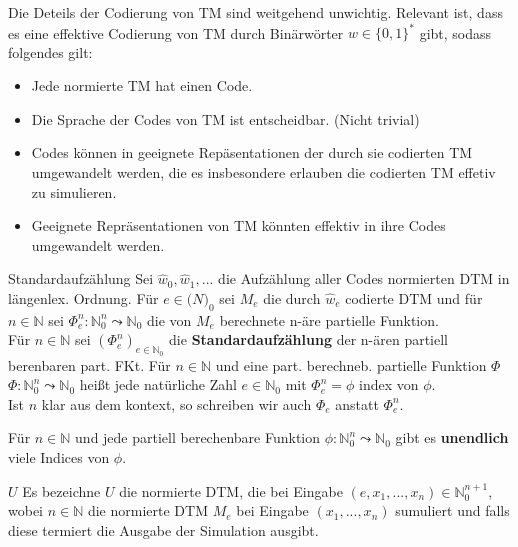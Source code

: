Die Deteils der Codierung von TM sind weitgehend unwichtig. Relevant ist, dass es eine effektive Codierung 
von TM durch Binärwörter $w \in \{0,1\}^*$ gibt, sodass folgendes gilt:
\begin{itemize}
    \item Jede normierte TM hat einen Code.
    \item Die Sprache der Codes von TM ist entscheidbar. (Nicht trivial)
    \item Codes können in geeignete Repäsentationen der durch sie codierten TM umgewandelt werden, die es 
          insbesondere erlauben die codierten TM effetiv zu simulieren.
    \item Geeignete Repräsentationen von TM könnten effektiv in ihre Codes umgewandelt werden.
\end{itemize}

\begin{defn}{Standardaufzählung}
    Sei $\hat{w}_0, \hat{w}_1,...$ die Aufzählung aller Codes normierten DTM in längenlex. Ordnung. Für $e \in \mathbb(N)_0$ sei $M_e$
    die durch $\hat{w}_e$ codierte DTM und für $n \in \mathbb{N}$ sei $\Phi_e^n : \mathbb{N}_0^n \leadsto \mathbb{N}_0$ die von $M_e$ 
    berechnete n-äre partielle Funktion.\\
    
    Für $n \in \mathbb{N}$ sei $(\Phi_e^n)_{e \in \mathbb{N}_0}$ die \textbf{Standardaufzählung} der n-ären partiell berenbaren part. FKt. 
    Für $n \in \mathbb{N}$ und eine part. berechneb. partielle Funktion $\Phi$
    $\Phi : \mathbb{N}_0^n \leadsto \mathbb{N}_0$ heißt jede natürliche Zahl $e \in \mathbb{N}_0$ mit $\Phi_e^n = \phi$ index von $\phi$. \\
    Ist $n$ klar aus dem kontext, so schreiben wir auch $\Phi_e$ anstatt $\Phi_e^n$. \\
\end{defn}

\begin{bem}
    Für $n \in \mathbb{N}$ und jede partiell berechenbare Funktion $\phi : \mathbb{N}_0^n \leadsto \mathbb{N}_0$ gibt es \textbf{unendlich} viele Indices von $\phi$.
\end{bem}

\begin{defn}{$U$}
    Es bezeichne $U$ die normierte DTM, die bei Eingabe $(e,x_1,...,x_n) \in \mathbb{N}_0^{n+1}$, wobei $n \in \mathbb{N}$ 
    die normierte DTM $M_e$ bei Eingabe $(x_1,...,x_n)$ sumuliert und falls diese termiert die Ausgabe der Simulation ausgibt.
\end{defn}

